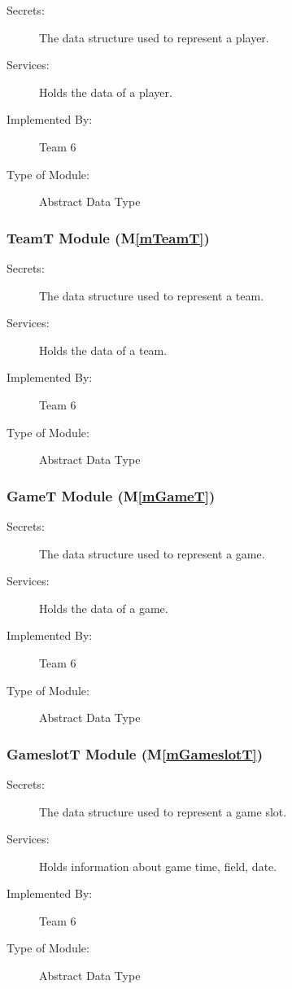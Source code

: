 \documentclass[12pt, titlepage]{article}
\newcommand{\mref}[1]{M\ref{#1}}
\begin{document}
\begin{description}
  \item[Secrets:] The data structure used to represent a player.
  \item[Services:] Holds the data of a player.
  \item[Implemented By:] Team 6
  \item[Type of Module:] Abstract Data Type
\end{description}

\subsubsection{TeamT Module (\mref{mTeamT})}

\begin{description}
  \item[Secrets:] The data structure used to represent a team.
  \item[Services:] Holds the data of a team.
  \item[Implemented By:] Team 6
  \item[Type of Module:] Abstract Data Type
\end{description}

\subsubsection{GameT Module (\mref{mGameT})}

\begin{description}
  \item[Secrets:] The data structure used to represent a game.
  \item[Services:] Holds the data of a game.
  \item[Implemented By:] Team 6
  \item[Type of Module:] Abstract Data Type
\end{description}

\subsubsection{GameslotT Module (\mref{mGameslotT})}

\begin{description}
  \item[Secrets:] The data structure used to represent a game slot.
  \item[Services:] Holds information about game time, field, date.
  \item[Implemented By:] Team 6
  \item[Type of Module:] Abstract Data Type
\end{description}
\end{document}
